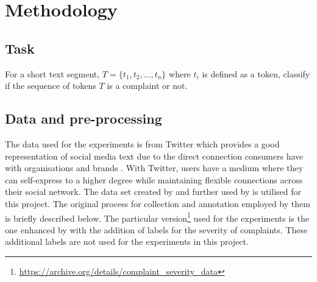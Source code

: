 \chapter{Methodology}

\section{Task}
For a short text segment, $T = \{t_1, t_2, ..., t_n\}$ where $t_i$ is defined as a token, classify if the sequence of tokens $T$ is a complaint or not.

\section{Data and pre-processing}
The data used for the experiments is from Twitter which provides a good representation of social media text due to the direct connection consumers have with organisations and brands \cite{preotiuc-pietro_automatically_2019}. With Twitter, users have a medium where they can self-express to a higher degree while maintaining flexible connections across their social network\cite{shane-simpsonWhyCollegeStudents2018}. The data set created by \cite{preotiuc-pietro_automatically_2019} and further used by \cite{jin_complaint_2020} is utilised for this project. The original process for collection and annotation employed by them is briefly described below. The particular version\footnote{\url{https://archive.org/details/complaint_severity_data}} used for the experiments is the one enhanced by \cite{jinModelingSeverityComplaints2021} with the addition of labels for the severity of complaints. These additional labels are not used for the experiments in this project.
